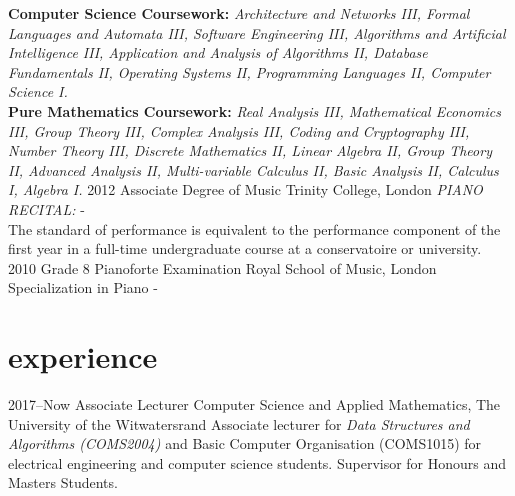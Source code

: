 \documentclass[]{friggeri-cv} %
\begin{document}
\begin{entrylist}
{{\bf Computer Science Coursework: } \emph{Architecture and Networks III, Formal Languages and Automata III, Software Engineering III, Algorithms and Artificial Intelligence III, Application and Analysis of Algorithms II, Database Fundamentals II, Operating Systems II, Programming Languages II, Computer Science I.}\\
{\bf Pure Mathematics Coursework: } \emph{ Real Analysis III, Mathematical Economics III, Group Theory III, Complex Analysis III, Coding and Cryptography III, Number Theory III, Discrete Mathematics II, Linear Algebra II, Group Theory II, Advanced Analysis II,  Multi-variable Calculus II, Basic Analysis II, Calculus I, Algebra I.}
}
\entry
{2012}
{Associate {\normalfont Degree of Music}}
{Trinity College, London}
{\emph{PIANO RECITAL:} - {\bf \color{bloodred}{with distinction}} \\
The standard of performance is equivalent to the performance component of the first year in a full-time undergraduate course at a conservatoire or university.}
\entry
{2010}
{Grade 8 {\normalfont Pianoforte Examination}}
{Royal School of Music, London}
{Specialization in Piano - {\bf \color{bloodred}{with distinction}}}
\end{entrylist}


\section{experience}

\begin{entrylist}
\entry
{2017--Now}
{Associate {\normalfont Lecturer}}
{Computer Science and Applied Mathematics, The University of the Witwatersrand}
{Associate lecturer for \textit{Data Structures and Algorithms (COMS2004)} and Basic Computer Organisation (COMS1015) for electrical engineering and computer science students. Supervisor for Honours and Masters Students. 
}
\end{entrylist}
\end{document}
